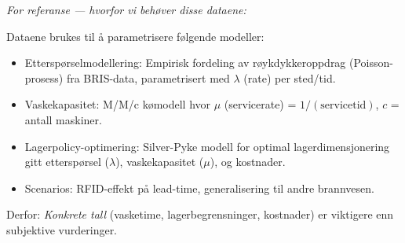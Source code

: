 \documentclass[12pt, a4paper, norsk]{article}
\begin{document}
\noindent
\textit{For referanse — hvorfor vi behøver disse dataene:}

\vspace{0.5cm}

\noindent
Dataene brukes til å parametrisere følgende modeller:

\begin{itemize}
\item[\textbf{RQ1:}] Etterspørselmodellering: 
  Empirisk fordeling av røykdykkeroppdrag (Poisson-prosess) fra BRIS-data, parametrisert med $\lambda$ (rate) per sted/tid.

\item[\textbf{RQ2:}] Vaskekapasitet: 
  M/M/c kømodell hvor $\mu$ (servicerate) = $1 / (\text{servicetid})$, $c$ = antall maskiner.
  
\item[\textbf{RQ3:}] Lagerpolicy-optimering: 
  Silver-Pyke modell for optimal lagerdimensjonering gitt etterspørsel ($\lambda$), vaskekapasitet ($\mu$), og kostnader.
  
\item[\textbf{RQ4-5:}] Scenarios: 
  RFID-effekt på lead-time, generalisering til andre brannvesen.
\end{itemize}

\vspace{0.5cm}

\noindent
Derfor: \textit{Konkrete tall} (vasketime, lagerbegrensninger, kostnader) er viktigere enn subjektive vurderinger.
\end{document}
